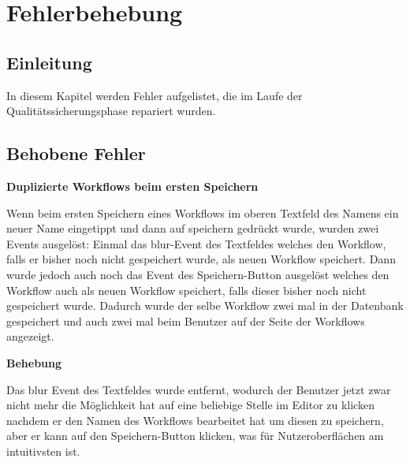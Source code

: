 \chapter{Fehlerbehebung}
\section{Einleitung}

In diesem Kapitel werden Fehler aufgelistet, die im Laufe der Qualitätssicherungsphase repariert wurden.\newline

\section{Behobene Fehler}


\textbf{\large Duplizierte Workflows beim ersten Speichern}
\newline


Wenn beim ersten Speichern eines Workflows im oberen Textfeld des Namens ein neuer Name eingetippt und dann auf speichern gedrückt wurde, wurden zwei \gls{Event}s ausgelöst:\newline
Einmal das \gls{blur}-Event des Textfeldes welches den Workflow, falls er bisher noch nicht gespeichert wurde, als neuen Workflow speichert.
Dann wurde jedoch auch noch das Event des Speichern-Button ausgelöst welches den Workflow auch als neuen Workflow speichert, falls dieser bisher noch nicht gespeichert wurde.
Dadurch wurde der selbe Workflow zwei mal in der Datenbank gespeichert und auch zwei mal beim Benutzer auf der Seite der Workflows angezeigt.
\newline


\textbf{Behebung}
\newline


Das blur Event des Textfeldes wurde entfernt, wodurch der Benutzer jetzt zwar nicht mehr die Möglichkeit hat auf eine beliebige Stelle im Editor zu klicken nachdem er den Namen des Workflows bearbeitet hat um diesen zu speichern, aber er kann auf den Speichern-Button klicken, was für Nutzeroberflächen am intuitivsten ist.
\newline

\vspace{2em}



